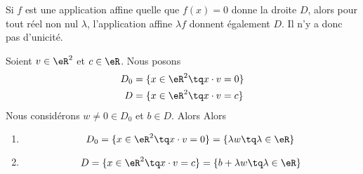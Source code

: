 Si \( f\) est une application affine quelle que \( f(x)=0\) donne la droite \( D\), alors pour tout réel non nul \( \lambda\), l'application affine \( \lambda f\)  donnent également \( D\). Il n'y a donc pas d'unicité.

\begin{proposition}	\label{PROPooTIIUooNtbQLz}
	Soient \( v\in \eR^2\) et \( c\in \eR\). Nous posons
	\begin{subequations}
		\begin{align}
			D_0 & =\{ x\in \eR^2\tq x\cdot v=0 \} \\
			D   & =\{ x\in \eR^2\tq x\cdot v=c \}
		\end{align}
	\end{subequations}
	Nous considérons \( w\neq 0\in D_0\) et \( b\in D\). Alors
	Alors
	\begin{enumerate}
		\item		\label{ITEMooSTSZooKMQImS}
		      \begin{equation}
			      D_0=\{ x\in \eR^2\tq x\cdot v=0 \}=\{ \lambda w\tq \lambda\in \eR \}
		      \end{equation}
		\item		\label{ITEMooWNRSooLcCikX}
		      \begin{equation}
			      D=\{ x\in \eR^2\tq x\cdot v=c \}=\{ b+\lambda w\tq \lambda\in \eR \}
		      \end{equation}
	\end{enumerate}
\end{proposition}

